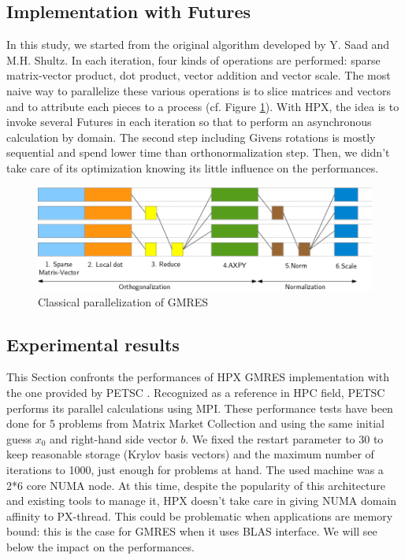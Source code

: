 \documentclass{llncs}
\begin{document}
\subsection{Implementation with Futures}
In this study, we started from the original algorithm \cite{GMRES} developed by Y. Saad and M.H. Shultz. In each iteration, four kinds of operations are performed: sparse matrix-vector product, dot product, vector addition and vector scale. The most naive way to parallelize these various operations is to slice matrices and vectors and to attribute each pieces to a process (cf. Figure \ref{pargmres}). With HPX, the idea is to invoke several Futures in each iteration so that to perform an asynchronous calculation by domain. The second step including Givens rotations is mostly sequential and spend lower time than orthonormalization step. Then, we didn't take care of its optimization knowing its little influence on the performances.

\begin{figure}[h]
\begin{center}
\includegraphics[scale=0.5]{Images/Im6.png}
\end{center}
\caption{Classical parallelization of GMRES}
\label{pargmres}
\end{figure}

\subsection{Experimental results}
This Section confronts the performances of HPX GMRES implementation with the one provided by PETSC \cite{Petsc}. Recognized as a reference in HPC field, PETSC performs its parallel calculations using MPI. These performance tests have been done for 5 problems from Matrix Market Collection and using the same initial guess $x_{0}$ and right-hand side vector $b$. We fixed the restart parameter to 30 to keep reasonable storage (Krylov basis vectors) and the maximum number of iterations to 1000, just enough for problems at hand. The used machine was a 2*6 core NUMA node. At this time, despite the popularity of this architecture and existing tools to manage it, HPX doesn't take care in giving NUMA domain affinity to PX-thread. This could be problematic when applications are memory bound: this is the case for GMRES when it uses BLAS interface. We will see below the impact on the performances.\smallskip  
\end{document}

